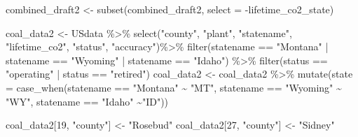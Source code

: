 \documentclass[
]{article}
\newenvironment{Shaded}{\begin{snugshade}}{\end{snugshade}}
\newcommand{\AttributeTok}[1]{\textcolor[rgb]{0.77,0.63,0.00}{#1}}
\newcommand{\DecValTok}[1]{\textcolor[rgb]{0.00,0.00,0.81}{#1}}
\newcommand{\FunctionTok}[1]{\textcolor[rgb]{0.00,0.00,0.00}{#1}}
\newcommand{\NormalTok}[1]{#1}
\newcommand{\OtherTok}[1]{\textcolor[rgb]{0.56,0.35,0.01}{#1}}
\newcommand{\SpecialCharTok}[1]{\textcolor[rgb]{0.00,0.00,0.00}{#1}}
\newcommand{\StringTok}[1]{\textcolor[rgb]{0.31,0.60,0.02}{#1}}
\begin{document}
\begin{Shaded}
\begin{Highlighting}[]
\NormalTok{combined\_draft2 }\OtherTok{\textless{}{-}} \FunctionTok{subset}\NormalTok{(combined\_draft2, }\AttributeTok{select =} \SpecialCharTok{{-}}\NormalTok{lifetime\_co2\_state)}


\NormalTok{coal\_data2 }\OtherTok{\textless{}{-}}\NormalTok{ USdata }\SpecialCharTok{\%\textgreater{}\%} \FunctionTok{select}\NormalTok{(}\StringTok{"county"}\NormalTok{, }\StringTok{"plant"}\NormalTok{, }\StringTok{"statename"}\NormalTok{, }\StringTok{"lifetime\_co2"}\NormalTok{, }\StringTok{"status"}\NormalTok{, }\StringTok{"accuracy"}\NormalTok{)}\SpecialCharTok{\%\textgreater{}\%} \FunctionTok{filter}\NormalTok{(statename }\SpecialCharTok{==} \StringTok{"Montana"} \SpecialCharTok{|}\NormalTok{ statename }\SpecialCharTok{==} \StringTok{"Wyoming"} \SpecialCharTok{|}\NormalTok{ statename }\SpecialCharTok{==} \StringTok{"Idaho"}\NormalTok{) }\SpecialCharTok{\%\textgreater{}\%} \FunctionTok{filter}\NormalTok{(status }\SpecialCharTok{==} \StringTok{"operating"} \SpecialCharTok{|}\NormalTok{ status }\SpecialCharTok{==} \StringTok{"retired"}\NormalTok{) }
\NormalTok{coal\_data2 }\OtherTok{\textless{}{-}}\NormalTok{ coal\_data2 }\SpecialCharTok{\%\textgreater{}\%} \FunctionTok{mutate}\NormalTok{(}\AttributeTok{state =} \FunctionTok{case\_when}\NormalTok{(statename }\SpecialCharTok{==} \StringTok{"Montana"} \SpecialCharTok{\textasciitilde{}} \StringTok{"MT"}\NormalTok{, statename }\SpecialCharTok{==} \StringTok{"Wyoming"} \SpecialCharTok{\textasciitilde{}} \StringTok{"WY"}\NormalTok{, statename }\SpecialCharTok{==} \StringTok{"Idaho"} \SpecialCharTok{\textasciitilde{}}\StringTok{"ID"}\NormalTok{))}

\NormalTok{coal\_data2[}\DecValTok{19}\NormalTok{, }\StringTok{"county"}\NormalTok{] }\OtherTok{\textless{}{-}} \StringTok{"Rosebud"}
\NormalTok{coal\_data2[}\DecValTok{27}\NormalTok{, }\StringTok{"county"}\NormalTok{] }\OtherTok{\textless{}{-}} \StringTok{"Sidney"}


\end{Highlighting}
\end{Shaded}
\end{document}
